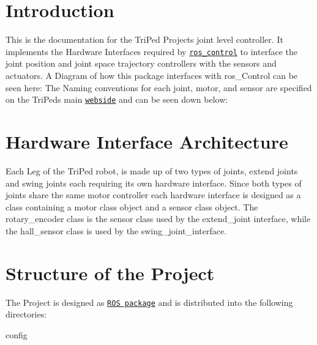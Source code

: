 \hypertarget{index_intro}{}\section{Introduction}\label{index_intro}
This is the documentation for the Tri\+Ped Projects joint level controller. It implements the Hardware Interfaces required by \href{http://wiki.ros.org/ros_control}{\tt ros\+\_\+control} to interface the joint position and joint space trajectory controllers with the sensors and actuators. A Diagram of how this package interfaces with ros\+\_\+\+Control can be seen here\+:  The Naming conventions for each joint, motor, and sensor are specified on the Tri\+Peds main \href{https://triped-robot.github.io/docs/legs/}{\tt webside} and can be seen down below\+:  \hypertarget{index_arch}{}\section{Hardware Interface Architecture}\label{index_arch}
Each Leg of the Tri\+Ped robot, is made up of two types of joints, extend joints and swing joints each requiring its own hardware interface. Since both types of joints share the same motor controller each hardware interface is designed as a class containing a motor class object and a sensor class object. The rotary\+\_\+encoder class is the sensor class used by the extend\+\_\+joint interface, while the hall\+\_\+sensor class is used by the swing\+\_\+joint\+\_\+interface. \hypertarget{index_content}{}\section{Structure of the Project}\label{index_content}
The Project is designed as \href{http://wiki.ros.org/Packages}{\tt R\+OS package} and is distributed into the following directories\+:


\begin{DoxyItemize}
\item config
\end{DoxyItemize}

